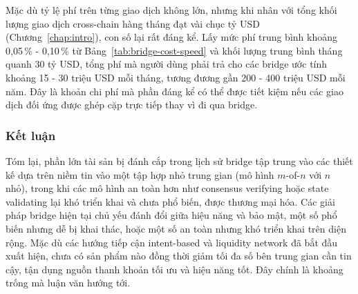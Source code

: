 Mặc dù tỷ lệ phí trên từng giao dịch không lớn, nhưng khi nhân với tổng khối
lượng giao dịch cross-chain hàng tháng đạt vài chục tỷ USD (Chương~\ref{chap:intro}),
con số lại rất đáng kể. Lấy mức phí trung bình khoảng 0{,}05\,\% - 0{,}10\,\%
từ Bảng~\ref{tab:bridge-cost-speed} và khối lượng trung bình tháng quanh 30 tỷ USD,
tổng phí mà người dùng phải trả cho các bridge ước tính khoảng 15 - 30 triệu USD
mỗi tháng, tương đương gần 200 - 400 triệu USD mỗi năm. Đây là khoản chi phí mà
phần đáng kể có thể được tiết kiệm nếu các giao dịch đối ứng được ghép cặp trực
tiếp thay vì đi qua bridge.

\subsubsection*{Kết luận}

Tóm lại, phần lớn tài sản bị đánh cắp trong lịch sử bridge tập trung vào các thiết kế
dựa trên niềm tin vào một tập hợp nhỏ trung gian (mô hình $m$-of-$n$ với $n$ nhỏ), 
trong khi các mô hình an toàn hơn như consensus verifying hoặc state validating 
lại khó triển khai và chưa phổ biến, được thương mại hóa. 
Các giải pháp bridge hiện tại chủ yếu đánh đổi giữa hiệu năng và bảo mật, một số
phổ biến nhưng dễ bị khai thác, hoặc một số an toàn nhưng khó triển khai trên diện rộng. 
Mặc dù các hướng tiếp cận intent-based và liquidity network đã bắt đầu xuất hiện, 
chưa có sản phẩm nào đồng thời giảm tối đa số bên trung gian cần tin cậy, 
tận dụng nguồn thanh khoản tối ưu và hiệu năng tốt. 
Đây chính là khoảng trống mà luận văn hướng tới.

